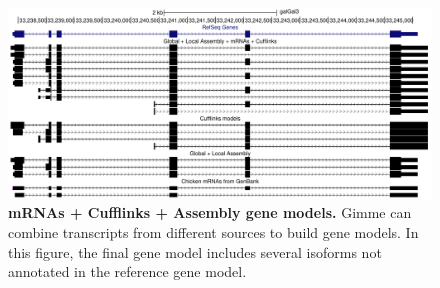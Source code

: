 \documentclass[10pt]{article}
\begin{document}
\begin{figure}[!ht]
\begin{center}
\includegraphics[width=5in]{mrna_cuff_gimme.pdf}
\end{center}
\caption{
{\bf mRNAs + Cufflinks + Assembly gene models.}
Gimme can combine transcripts from different sources to build gene models.
In this figure, the final gene model includes several isoforms not annotated in the reference gene model.
}
\label{mrna_cuff_gimme}
\end{figure}
\end{document}
